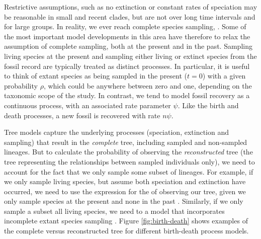 Restrictive assumptions, such as no extinction or constant rates of speciation may be reasonable in small and recent clades, but are not  over long time intervals and for large groups.
In reality, we  ever reach complete species sampling, .
Some of the most important model developments in this area have therefore  to relax the assumption of complete sampling, both at the present and in the past.
Sampling living species at the present and sampling either living or extinct species from the fossil record are typically treated as distinct processes.
In particular, it is useful to think of extant species as being sampled in the present ($t=0$) with a given probability $\rho$, which could be anywhere between zero and one, depending on the taxonomic scope of the study.
In contrast, we tend to model fossil recovery as a continuous process, with an associated rate parameter $\psi$. Like the birth and death processes, a new fossil is recovered with rate $n\psi$.

Tree models capture the underlying processes (speciation, extinction and sampling) that result in the \textit{complete} tree, including sampled and non-sampled lineages. But to calculate the probability of observing the  \textit{reconstructed} tree (the tree representing the relationships between sampled individuals only), we need to account for the fact that we only sample some subset of lineages.
For example, if we only sample living species, but assume both speciation and extinction have occurred, we need to use the expression for the  of observing our tree, given we only sample species at the present and none in the past \citep{Thompson1975,Gernhard2008, Stadler2009}.  Similarly, if we only sample a subset  all living species, we need to  a model that incorporates incomplete extant species sampling \citep{Yang1997,Stadler2009}.
Figure \ref{fig:birth-death} shows examples of the complete versus  reconstructed tree for different birth-death process models.

